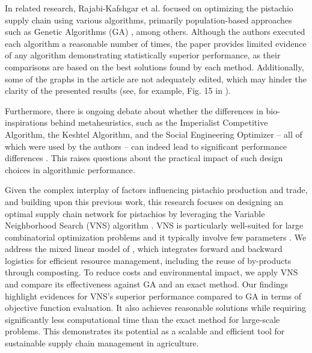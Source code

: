 \documentclass[sn-nature]{sn-jnl}%
\theoremstyle{thmstyleone}%
\theoremstyle{thmstyletwo}%
\theoremstyle{thmstylethree}%
\begin{document}
In related research, Rajabi-Kafshgar et al. \cite{rajabi2023utilizing} focused on optimizing the pistachio supply chain using various algorithms, primarily population-based approaches such as Genetic Algorithms (GA) \cite{fathollahi2018stochastic,xie2022adaptive}, among others. Although the authors executed each algorithm a reasonable number of times, the paper provides limited evidence of any algorithm demonstrating statistically superior performance, as their comparisons are based on the best solutions found by each method. Additionally, some of the graphs in the article are not adequately edited, which may hinder the clarity of the presented results (see, for example, Fig. 15 in \cite{rajabi2023utilizing}).

Furthermore, there is ongoing debate about whether the differences in bio-inspirations behind metaheuristics, such as the Imperialist Competitive Algorithm, the Keshtel Algorithm, and the Social Engineering Optimizer -- all of which were used by the authors -- can indeed lead to significant performance differences \cite{campelo2023lessons,aranha2022metaphor}. This raises questions about the practical impact of such design choices in algorithmic performance.

Given the complex interplay of factors influencing pistachio production and trade, and building upon this previous work, this research focuses on 
designing an optimal supply chain network for pistachios by leveraging the Variable Neighborhood Search (VNS) algorithm \cite{gendreau2010handbook}. VNS is particularly well-suited for large combinatorial optimization problems and it typically involve few parameters \cite{hansen2010variable}. We address the mixed linear model of \cite{rajabi2023utilizing}, which integrates forward and backward 
logistics for efficient resource management, including the reuse of by-products through composting. To reduce costs and environmental impact, 
we apply VNS and compare its effectiveness against GA and an exact method. Our findings highlight evidences for VNS's superior performance compared to GA in terms of objective function evaluation. It also achieves reasonable solutions while requiring significantly less computational time than the exact method for large-scale problems. This demonstrates its potential as a scalable and efficient tool for sustainable supply chain management in agriculture.
\end{document}
